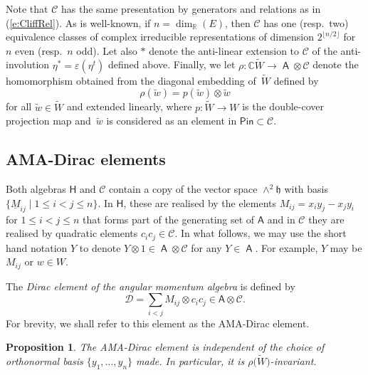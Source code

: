 \documentclass[pdftex]{sigma}
\numberwithin{equation}{section}
\newtheorem{Proposition}[Theorem]{Proposition}
 { \theoremstyle{definition}
\newtheorem{Definition}[Theorem]{Definition}
\newtheorem{Note}[Theorem]{Note}
\newtheorem{Example}[Theorem]{Example}
\newtheorem{Remark}[Theorem]{Remark} }
\newcommand{\fh}{\mathfrak{h}}
\newcommand{\bbc}{\mathbb{C}}
\newcommand{\bbr}{\mathbb{R}}
\newcommand{\Cc}{\mathcal{C}}
\newcommand{\uM}{\underline{M}}
\newcommand{\Pin}{\mathsf{Pin}}
\DeclareMathOperator{\ama}{\mathsf{A}}
\begin{document}
Note that $\mathcal{C}$ has the same presentation by generators and relations as in (\ref{e:CliffRel}). As is well-known, if $n=\dim_\bbr(E)$, then $\mathcal{C}$ has one (resp.\ two) equivalence classes of complex irreducible representations of dimension $2^{\lfloor n/2 \rfloor}$ for $n$ even (resp.~$n$ odd). Let also $\ast$ denote the anti-linear extension to $\Cc$ of the anti-involution $\eta^\ast = \varepsilon(\eta^t)$ defined above.
 Finally, we let $\rho\colon \bbc\tilde W\to \ama\otimes\mathcal{C}$ denote the homomorphism obtained from the diagonal embedding of~$\tilde W$ defined by
\begin{equation}\label{ed:rhodef}
\rho(\tilde w) = p(\tilde w)\otimes \tilde w
\end{equation}
 for all $\tilde w\in\tilde W$ and extended linearly, where $p\colon \tilde W\to W$ is the double-cover projection map and~$\tilde{w}$ is considered as an element in $\Pin \subset \Cc$.

\subsection{AMA-Dirac elements}
Both algebras $\mathsf{H}$ and $\mathcal{C}$
contain a copy of the vector space $\wedge^2\fh$ with basis
$\{\uM_{ij}\mid 1\leq i<j \leq n\}$. In $\mathsf{H}$, these are realised by the elements $M_{ij} = x_iy_j-x_jy_i$ for $1\leq i<j \leq n$ that forms part of the generating set of $\mathsf{A}$ and in $\mathcal{C}$ they are realised by quadratic elements $c_ic_j\in\mathcal{C}$. In what follows, we may use the short hand notation $Y$ to denote $Y \otimes 1 \in \ama \otimes \Cc$ for any $Y \in \ama$. For example, $Y$ may be $M_{ij}$ or $w \in W$.

\begin{Definition}
The {\it Dirac element of the angular momentum algebra} is defined by
\begin{equation*}
 \mathcal{D} = \sum_{i<j} M_{ij}\otimes c_ic_j \in \mathsf{A}\otimes \mathcal{C}.
\end{equation*}
For brevity, we shall refer to this element as the AMA-Dirac element.
\end{Definition}

\begin{Proposition}
The AMA-Dirac element is independent of the choice of orthonormal basis $\{y_1,\dots,y_n\}$ made. In particular, it is $\rho\big(\tilde W\big)$-invariant.
\end{Proposition}
\end{document}
